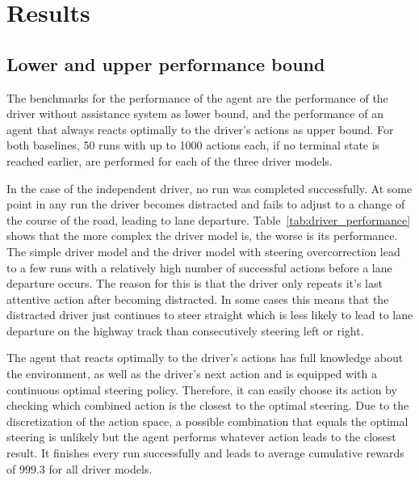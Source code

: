 \chapter{Results}
\label{ch:results}


\section{Lower and upper performance bound}

The benchmarks for the performance of the agent are the performance of the driver without assistance system as lower bound, and the performance of an agent that always reacts optimally to the driver's actions as upper bound. For both baselines, 50 runs with up to 1000 actions each, if no terminal state is reached earlier, are performed for each of the three driver models. 

In the case of the independent driver, no run was completed successfully. At some point in any run the driver becomes distracted and fails to adjust to a change of the course of the road, leading to lane departure. Table~\ref{tab:driver_performance} shows that the more complex the driver model is, the worse is its performance. The simple driver model and the driver model with steering overcorrection lead to a few runs with a relatively high number of successful actions before a lane departure occurs. The reason for this is that the driver only repeats it's last attentive action after becoming distracted. In some cases this means that the distracted driver just continues to steer straight which is less likely to lead to lane departure on the highway track than consecutively steering left or right.

The agent that reacts optimally to the driver's actions has full knowledge about the environment, as well as the driver's next action and is equipped with a continuous optimal steering policy. Therefore, it can easily choose its action by checking which combined action is the closest to the optimal steering. Due to the discretization of the action space, a possible combination that equals the optimal steering is unlikely but the agent performs whatever action leads to the closest result. It finishes every run successfully and leads to average cumulative rewards of $999.3$ for all driver models.


